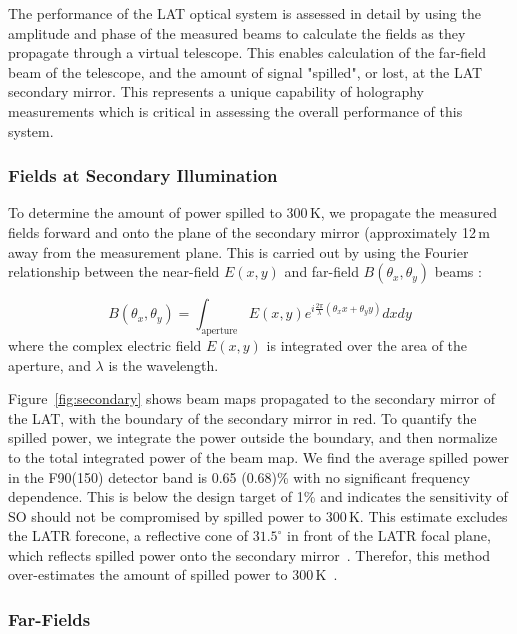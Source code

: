 The performance of the LAT optical system is assessed in detail by using the amplitude and phase of the measured beams to calculate the fields as they propagate through a virtual telescope.  This enables calculation of the far-field beam of the telescope, and the amount of signal "spilled", or lost, at the LAT secondary mirror.  This represents a unique capability of holography measurements which is critical in assessing the overall performance of this system. 

\subsubsection{Fields at Secondary Illumination}
To determine the amount of power spilled to 300\,K, we propagate the measured fields forward and onto the plane of the secondary mirror (approximately 12\,m away from the measurement plane.  This is carried out by using the Fourier relationship between the near-field $E(x,y)$ and far-field $B(\theta_x,\theta_y)$ beams \cite{McIntosh2016,alma_holog}:

\begin{equation}
    B(\theta_x,\theta_y) = \int_{\text{aperture}} E(x,y) e^{ i \frac{2\pi}{\lambda} (\theta_x x + \theta_y y )} dx dy 
    \label{eq:fft}
\end{equation}
where the complex electric field $E(x,y)$ is integrated over the area of the aperture, and $\lambda$ is the wavelength.

Figure~\ref{fig:secondary} shows beam maps propagated to the secondary mirror of the LAT, with the boundary  of the secondary mirror in red.  To quantify the spilled power, we integrate the power outside the boundary, and then normalize to the total integrated power of the beam map.  We find the average spilled power in the F90(150) detector band is 0.65 (0.68)\% with no significant frequency dependence.  This is below the design target of 1\% and indicates the sensitivity of SO should not be compromised by spilled power to 300\,K.  This estimate excludes the LATR forecone, a reflective cone of $31.5^\circ$ in front of the LATR focal plane, which reflects spilled power onto the secondary mirror~\cite{2021RNAAS...5..100X}.  Therefor, this method over-estimates the amount of spilled power to 300\,K~\cite{Gudmundsson:21}.

\subsubsection{Far-Fields}

